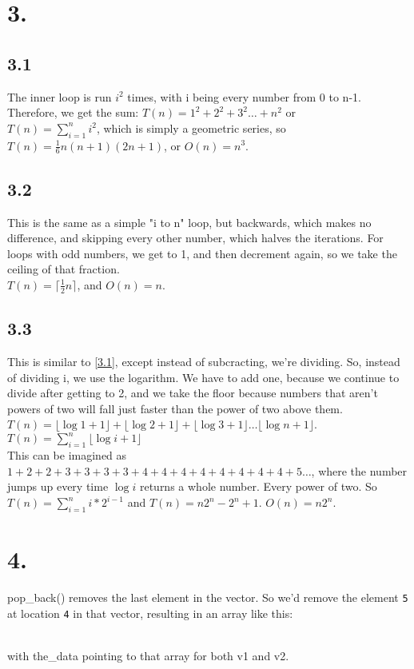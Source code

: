 \documentclass[12pt]{article}
\begin{document}
\section*{3.}
\subsection*{3.1}
The inner loop is run \(i^2\) times, with i being every number from 0 to n-1. Therefore, we get the sum:
\(T(n)=1^2+2^2+3^2\dots+n^2\) or\\
\(T(n)=\displaystyle\sum_{i=1}^n i^2\), which is simply a geometric series, so \(T(n)=\frac{1}{6}n(n+1)(2n+1)\), or \(O(n)=n^3\).
\subsection*{3.2}
This is the same as a simple "i to n" loop, but backwards, which makes no difference, and skipping every other number, which halves the iterations. For loops with odd numbers, we get to 1, and then decrement again, so we take the ceiling of that fraction.\\
\(T(n)=\lceil\frac{1}{2}n\rceil\), and \(O(n)=n\).\\
\subsection*{3.3}
This is similar to \ref{3.1}, except instead of subcracting, we're dividing. So, instead of dividing i, we use the logarithm. We have to add one, because we continue to divide after getting to 2, and we take the floor because numbers that aren't powers of two will fall just faster than the power of two above them.\\
\(T(n)=\lfloor\log 1+1\rfloor+\lfloor\log 2+1\rfloor+\lfloor\log 3+1\rfloor\dots\lfloor\log n+1\rfloor\).\\
\(T(n)=\displaystyle\sum_{i=1}^n \lfloor\log i+1\rfloor\)\\
This can be imagined as \(1+2+2+3+3+3+3+4+4+4+4+4+4+4+4+5\dots\), where the number jumps up every time \(\log i\) returns a whole number. Every power of two. So \(T(n)=\displaystyle\sum_{i=1}^n i*2^{i-1}\) and \(T(n)=n2^n-2^n+1\). \(O(n)=n2^n\).\\

\section*{4.}
pop\_back() removes the last element in the vector. So we'd remove the element \texttt{5} at location \texttt{4} in that vector, resulting in an array like this:

\\
with the\_data pointing to that array for both v1 and v2.
\end{document}
